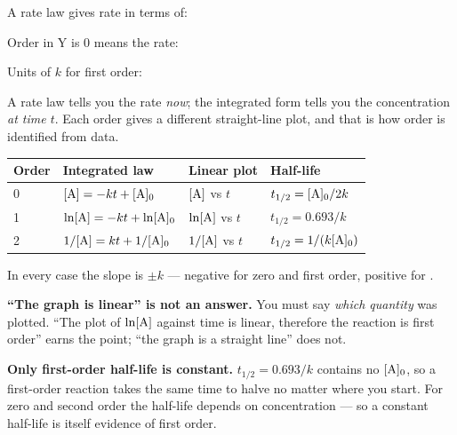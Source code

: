 \documentclass{apchem-notes}
\begin{document}

\begin{warmup}[3]
  \item A rate law gives rate in terms of:
  \item Order in Y is 0 means the rate:
  \item Units of $k$ for first order:
        \answerblank[2.4cm]{\si{\per\second}}
\end{warmup}



A rate law tells you the rate \emph{now}; the integrated form tells you the
concentration \emph{at time $t$}. Each order gives a different straight-line
plot, and that is how order is identified from data.

\begin{center}
\renewcommand{\arraystretch}{1.3}
\begin{tabular}{@{}llll@{}}
\hline
\textbf{Order} & \textbf{Integrated law} & \textbf{Linear plot} &
  \textbf{Half-life} \\
\hline
0 & $[\ce{A}] = -kt + [\ce{A}]_0$ & $[\ce{A}]$ vs $t$ &
  $t_{1/2} = [\ce{A}]_0/2k$ \\
1 & $\ln[\ce{A}] = -kt + \ln[\ce{A}]_0$ & $\ln[\ce{A}]$ vs $t$ &
  $t_{1/2} = 0.693/k$ \\
2 & $1/[\ce{A}] = kt + 1/[\ce{A}]_0$ & $1/[\ce{A}]$ vs $t$ &
  $t_{1/2} = 1/(k[\ce{A}]_0)$ \\
\hline
\end{tabular}
\end{center}

In every case the slope is $\pm k$ --- negative for zero and first order,
positive for .

\begin{apctrap}
\textbf{``The graph is linear'' is not an answer.} You must say
\emph{which quantity} was plotted. ``The plot of $\ln[\ce{A}]$ against time
is linear, therefore the reaction is first order'' earns the point;
``the graph is a straight line'' does not.

\textbf{Only first-order half-life is constant.} $t_{1/2} = 0.693/k$
contains no $[\ce{A}]_0$, so a first-order reaction takes the same time to
halve no matter where you start. For zero and second order the half-life
depends on concentration --- so a constant half-life is itself evidence of
first order.
\end{apctrap}
\end{document}
